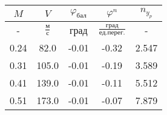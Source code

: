 \begin{tabular}{|c|c|c|c|c|}
\hline
$M$ & $V$ & $\varphi_{бал}$ & $\varphi^{n}$ & $n_{y_{p}}$ \\ 
\hline
- & $\frac{м}{с}$ & град & $\frac{град}{ед.перег.}$ & - \\ 
\hline
0.24 & 82.0 & -0.01 & -0.32 & 2.547 \\ 
\hline
0.31 & 105.0 & -0.01 & -0.19 & 3.589 \\ 
\hline
0.41 & 139.0 & -0.01 & -0.11 & 5.512 \\ 
\hline
0.51 & 173.0 & -0.01 & -0.07 & 7.879 \\ 
\hline
\end{tabular}